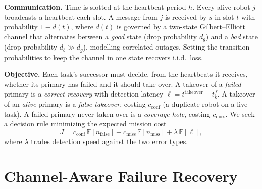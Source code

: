 \documentclass[conference]{IEEEtran}
\begin{document}
\textbf{Communication.} Time is slotted at the heartbeat period $h$. Every
alive robot $j$ broadcasts a heartbeat each slot. A message from $j$ is
received by $s$ in slot $t$ with probability $1-d(t)$, where $d(t)$ is governed
by a two-state Gilbert--Elliott channel that alternates between a \emph{good}
state (drop probability $d_{g}$) and a \emph{bad} state (drop probability
$d_{b}\!\gg\!d_{g}$), modelling correlated outages. Setting the transition
probabilities to keep the channel in one state recovers i.i.d.\ loss.

\textbf{Objective.} Each task's successor must decide, from the heartbeats it
receives, whether its primary has failed and it should take over. A takeover of
a \emph{failed} primary is a \emph{correct recovery} with detection latency
$\ell = t^{\text{takeover}} - t^{f}_{k}$. A takeover of an \emph{alive} primary
is a \emph{false takeover}, costing $c_{\text{conf}}$ (a duplicate robot on a
live task). A failed primary never taken over is a \emph{coverage hole},
costing $c_{\text{miss}}$. We seek a decision rule minimizing the expected
mission cost
\begin{equation}
J = c_{\text{conf}}\, \mathbb{E}[n_{\text{false}}]
  + c_{\text{miss}}\, \mathbb{E}[n_{\text{miss}}]
  + \lambda\, \mathbb{E}[\ell],
\label{eq:cost}
\end{equation}
where $\lambda$ trades detection speed against the two error types.

\section{Channel-Aware Failure Recovery}
\end{document}
